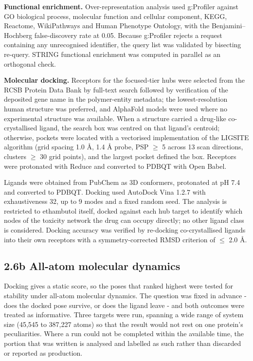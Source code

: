 \documentclass[utf8]{FrontiersinVancouver}
\begin{document}
\textbf{Functional enrichment.} Over-representation analysis used g:Profiler against GO biological process, molecular function and cellular component, KEGG, Reactome, WikiPathways and Human Phenotype Ontology, with the Benjamini--Hochberg false-discovery rate at 0.05. Because g:Profiler rejects a request containing any unrecognised identifier, the query list was validated by bisecting re-query. STRING functional enrichment was computed in parallel as an orthogonal check.

\textbf{Molecular docking.} Receptors for the focused-tier hubs were selected from the RCSB Protein Data Bank by full-text search followed by verification of the deposited gene name in the polymer-entity metadata; the lowest-resolution human structure was preferred, and AlphaFold models were used where no experimental structure was available. When a structure carried a drug-like co-crystallised ligand, the search box was centred on that ligand's centroid; otherwise, pockets were located with a vectorised implementation of the LIGSITE algorithm (grid spacing 1.0 \AA{}, 1.4 \AA{} probe, PSP $\geq$ 5 across 13 scan directions, clusters $\geq$ 30 grid points), and the largest pocket defined the box. Receptors were protonated with Reduce and converted to PDBQT with Open Babel.

Ligands were obtained from PubChem as 3D conformers, protonated at pH 7.4 and converted to PDBQT. Docking used AutoDock Vina 1.2.7 with exhaustiveness 32, up to 9 modes and a fixed random seed. The analysis is restricted to ethambutol itself, docked against each hub target to identify which nodes of the toxicity network the drug can occupy directly; no other ligand class is considered. Docking accuracy was verified by re-docking co-crystallised ligands into their own receptors with a symmetry-corrected RMSD criterion of $\leq$ 2.0 \AA{}.

\subsection{2.6b All-atom molecular dynamics}

Docking gives a static score, so the poses that ranked highest were tested for stability under all-atom molecular dynamics. The question was fixed in advance - does the docked pose survive, or does the ligand leave - and both outcomes were treated as informative. Three targets were run, spanning a wide range of system size (45,545 to 387,227 atoms) so that the result would not rest on one protein's peculiarities. Where a run could not be completed within the available time, the portion that was written is analysed and labelled as such rather than discarded or reported as production.
\end{document}
